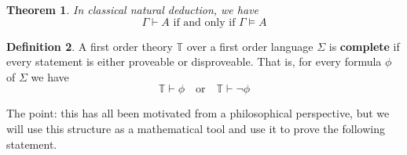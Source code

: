 \documentclass[12pt]{article}
\theoremstyle{plain}
\newtheorem{thm}{Theorem}[subsection] %
\theoremstyle{definition}
\newtheorem{defn}[thm]{Definition} %
\newcommand{\bb}[1]{\mathbb{#1}}
\begin{document}
\begin{thm}\label{thm:sound_complete}
	In classical natural deduction, we have
	\begin{equation}
		\Gamma \vdash A \text{ if and only if }\Gamma \models A
		\end{equation}
	\end{thm}

\begin{defn}
	A first order theory $\bb{T}$ over a first order language $\Sigma$ is \textbf{complete} if every statement is either proveable or disproveable. That is, for every formula $\phi$ of $\Sigma$ we have
	\begin{equation}
		\bb{T} \vdash \phi \quad \text{or} \quad \bb{T} \vdash \neg \phi
	\end{equation}
\end{defn}

The point: this has all been motivated from a philosophical perspective, but we will use this structure as a mathematical tool and use it to prove the following statement.
\end{document}
